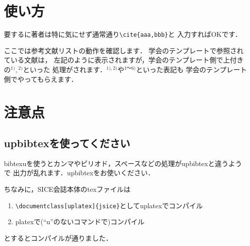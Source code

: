 \documentclass[a4j,fleqn,dvipdfmx,twocolumn]{jsarticle}
\begin{document}
\section{使い方}
要するに著者は特に気にせず通常通り\verb+\cite{aaa,bbb}+と
入力すればOKです．

ここでは参考文献リストの動作を確認します．
学会のテンプレートで参照されている文献\cite{1,2,3,4,5,6}は，
左記のように表示されますが，学会のテンプレート側で上付きの${}^{1)}, {}^{2)}$といった
処理がされます．${}^{1),2)}$や${}^{1\text{～}6)}$といった表記も
学会のテンプレート側でやってもらえます．

\section{注意点}
\subsection{upbibtexを使ってください}
bibtexuを使うとカンマやピリオド，スペースなどの処理がupbibtexと違うようで
出力が乱れます．upbibtexをお使いください．

ちなみに，SICE会誌本体のtexファイルは
\begin{enumerate}
	\item \verb+\documentclass[uplatex]{jsice}+としてuplatexでコンパイル
	\item platexで(``u''のないコマンドで)コンパイル
\end{enumerate}
とするとコンパイルが通りました．
\end{document}
